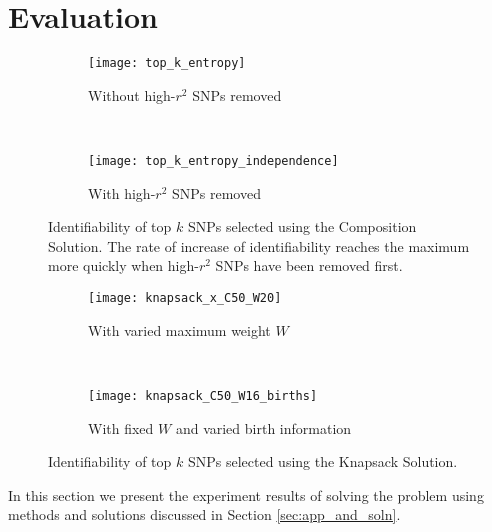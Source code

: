\documentclass[14pt, oneside]{article}   	%
\begin{document}
\section{Evaluation}
\begin{figure}[t]
    \centering
    \begin{subfigure}{0.45\textwidth}
        \texttt{[image: top\_k\_entropy]}
        \caption{Without high-$r^2$ SNPs removed}
        \label{fig:ent}
    \end{subfigure}
    ~ %
    \begin{subfigure}{0.45\textwidth}
        \texttt{[image: top\_k\_entropy\_independence]}
        \caption{With high-$r^2$ SNPs removed}
        \label{fig:ent_indep}
    \end{subfigure}
    \caption{Identifiability of top $k$ SNPs selected using the Composition Solution.
                  The rate of increase of identifiability reaches the maximum more quickly when high-$r^2$ SNPs have been removed first.}
    \label{fig:topk_ents}
\end{figure}
\begin{figure}[t]
    \centering
    \begin{subfigure}{0.45\textwidth}
        \texttt{[image: knapsack\_x\_C50\_W20]}
        \caption{With varied maximum weight $W$}
        \label{fig:C50W20}
    \end{subfigure}
    ~ %
    \begin{subfigure}{0.45\textwidth}
        \texttt{[image: knapsack\_C50\_W16\_births]}
        \caption{With fixed $W$ and varied birth information}
        \label{fig:C50W16births}
    \end{subfigure}
    \caption{Identifiability of top $k$ SNPs selected using the Knapsack Solution.}
    \label{fig:knapsack}
\end{figure}

In this section we present the experiment results of solving the problem using methods and solutions discussed in Section \ref{sec:app_and_soln}.
\end{document}

